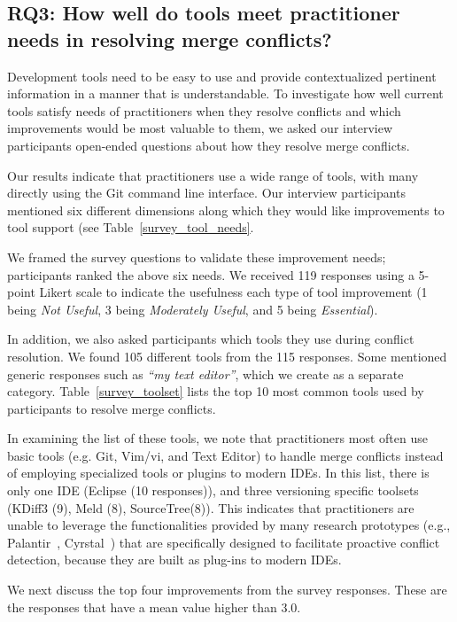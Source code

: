\subsection{\textbf{RQ3:} How well do tools meet practitioner needs in resolving merge conflicts?}\label{RQ3}
Development tools need to be easy to use and provide contextualized pertinent information in a manner that is understandable.
To investigate how well current tools satisfy needs of practitioners when they resolve conflicts and which improvements would be most valuable to them, we asked our interview participants open-ended questions about how they resolve merge conflicts. 

Our results indicate that practitioners use a wide range of tools, with many directly using the Git command line interface. Our interview participants mentioned six different dimensions along which they would like improvements to tool support (see Table~\ref{survey_tool_needs}. 

We framed the survey questions to validate these improvement needs; participants ranked the above six needs.
We received 119 responses using a 5-point Likert scale to indicate the usefulness each type of tool improvement (1 being \textit{Not Useful}, 3 being \textit{Moderately Useful}, and 5 being \textit{Essential}).

In addition, we also asked participants which tools they use during conflict resolution.
We found 105 different tools from the 115 responses. Some mentioned generic responses such as \textit{``my text editor''}, which we create as a separate category.
Table~\ref{survey_toolset} lists the top 10 most common tools used by participants to resolve merge conflicts.

In examining the list of these tools, we note that practitioners most often use basic tools (e.g. Git, Vim/vi, and Text Editor) to handle merge conflicts instead of employing specialized tools or plugins to modern IDEs. In this list, there is only one IDE (Eclipse (10 responses)), and three versioning specific toolsets (KDiff3 (9), Meld (8), SourceTree(8)). This indicates that practitioners are unable to leverage the functionalities provided by many research prototypes (e.g., Palantir~\cite{palantir}, Cyrstal~\cite{Brun2011}) that are specifically designed to facilitate proactive conflict detection, because they are built as plug-ins to modern IDEs. 

We next discuss the top four improvements from the survey responses. These are the responses that have a mean value higher than 3.0.

